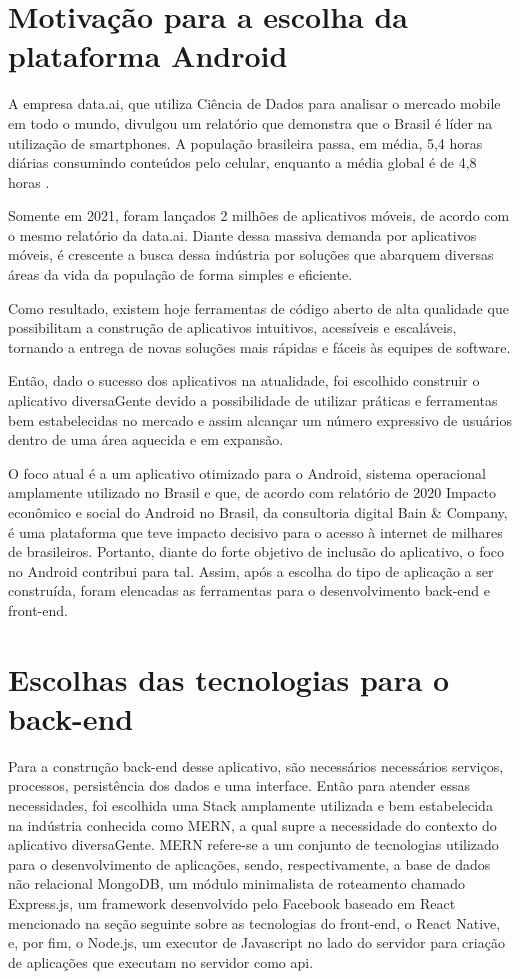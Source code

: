 \section{Motivação para a escolha da plataforma Android}
A empresa data.ai, que utiliza Ciência de Dados para analisar o mercado mobile em todo o mundo, divulgou um relatório que demonstra que o Brasil é líder na utilização de smartphones. A população brasileira passa, em média, 5,4 horas diárias consumindo conteúdos pelo celular, enquanto a média global é de 4,8 horas \cite{stateof}.

Somente em 2021, foram lançados 2 milhões de aplicativos móveis, de acordo com o mesmo relatório da data.ai. Diante dessa massiva demanda por aplicativos móveis, é crescente a busca dessa indústria por soluções que abarquem diversas áreas da vida da população de forma simples e eficiente. 

Como resultado, existem hoje ferramentas de código aberto de alta qualidade que possibilitam a construção de aplicativos intuitivos, acessíveis e escaláveis, tornando a entrega de novas soluções mais rápidas e fáceis às equipes de software. 

Então, dado o sucesso dos aplicativos na atualidade, foi escolhido construir o aplicativo diversaGente devido a possibilidade de utilizar práticas e ferramentas bem estabelecidas no mercado e assim alcançar um número expressivo de usuários dentro de uma área aquecida e em expansão.

O foco atual é a um aplicativo otimizado para o Android, sistema operacional amplamente utilizado no Brasil e que, de acordo com relatório de 2020 Impacto econômico e social do Android no Brasil, da consultoria digital Bain & Company, é uma plataforma que teve impacto decisivo para o acesso à internet de milhares de brasileiros. Portanto, diante do forte objetivo de inclusão do aplicativo, o foco no Android contribui para tal.
Assim, após a escolha do tipo de aplicação a ser construída, foram elencadas as ferramentas para o desenvolvimento back-end e front-end. 


\section{Escolhas das tecnologias para o back-end}
Para a construção back-end desse aplicativo, são necessários necessários serviços, processos, persistência dos dados e uma interface. Então para atender essas necessidades, foi escolhida uma Stack amplamente utilizada e bem estabelecida na indústria conhecida como MERN, a qual supre a necessidade do contexto do aplicativo diversaGente. 
MERN refere-se a um conjunto de tecnologias utilizado para o desenvolvimento de aplicações, sendo, respectivamente, a base de dados não relacional MongoDB, um módulo minimalista de roteamento chamado Express.js, um framework desenvolvido pelo Facebook baseado em React mencionado na seção seguinte sobre as tecnologias do front-end,  o React Native, e, por fim, o Node.js, um executor de Javascript no lado do servidor para criação de aplicações que executam no servidor como \ac{api}.

